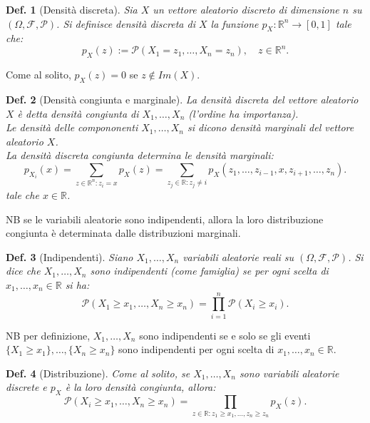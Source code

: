 \documentclass{article}
\newtheorem{definition}{Def.}[section]
\begin{document}
\begin{definition}[Densità discreta]
	Sia $X$ un vettore aleatorio discreto di dimensione $n$ su $(\Omega,
	\mathcal{F, P})$. Si definisce densità discreta di $X$ la funzione $p_X:
	\mathbb{R}^n \to [0, 1]$ tale che:
	\begin{equation}
		p_X(z) := \mathcal{P}(X_1 = z_1, \dots, X_n = z_n), \quad z \in \mathbb{R}^n.
	\end{equation}
\end{definition}
Come al solito, $p_X(z) = 0$ se $z \notin Im(X)$.

\begin{definition}[Densità congiunta e marginale]
	La densità discreta del vettore aleatorio $X$ è detta densità congiunta
	di $X_1, \dots, X_n$ (l'ordine ha importanza).\\

	Le densità delle compononenti $X_1, \dots, X_n$ si dicono densità marginali
	del vettore aleatorio $X$.\\

	La densità discreta congiunta determina le densità marginali:
	\begin{equation}
	p_{X_i}(x) = \sum_{z \in \mathbb{R}^n: z_i = x} p_X(z) = \sum_{z_j \in
	\mathbb{R}: z_j \not= i} p_X(z_1, \dots, z_{i-1}, x, z_{i+1}, \dots, z_n).
	\end{equation}
	tale che $x \in \mathbb{R}$.
\end{definition}
NB se le variabili aleatorie sono indipendenti, allora la loro distribuzione
congiunta è determinata dalle distribuzioni marginali.

\begin{definition}[Indipendenti]
	Siano $X_1, \dots, X_n$ variabili aleatorie reali su $(\Omega, \mathcal{F,
	P})$. Si dice che $X_1, \dots, X_n$ sono indipendenti (come famiglia) se per
	ogni scelta di $x_1, \dots, x_n \in \mathbb{R}$ si ha:
	\begin{equation}
		\mathcal{P}(X_1 \geq x_1, \dots, X_n \geq x_n) = \prod_{i = 1}^n
		\mathcal{P}(X_i \geq x_i).
	\end{equation}
\end{definition}
NB per definizione, $X_1, \dots, X_n$ sono indipendenti se e solo se gli eventi
$\{X_1 \geq x_1\}, \dots, \{X_n \geq x_n\}$ sono indipendenti per ogni scelta di
$x_1, \dots, x_n \in \mathbb{R}$.\\

\begin{definition}[Distribuzione]
Come al solito, se $X_1, \dots, X_n$ sono variabili aleatorie discrete e $p_X$ è
la loro densità congiunta, allora:
\begin{equation}
	\mathcal{P}(X_i \geq x_1, \dots, X_n \geq x_n) = \prod_{z \in \mathbb{R}:
	z_1 \geq x_1, \dots, z_n \geq z_n} p_{X}(z).
\end{equation}
\end{definition}
\end{document}
